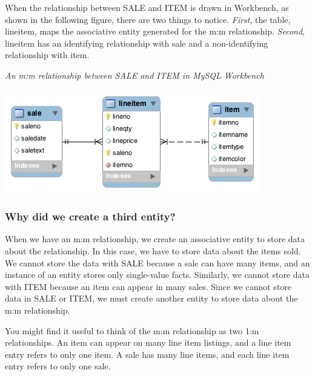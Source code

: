 \documentclass[
]{article}
\begin{document}
When the relationship between SALE and ITEM is drawn in Workbench, as shown in the following figure, there are two things to notice. \emph{First}, the table, lineitem, maps the associative entity generated for the m:m relationship. \emph{Second}, lineitem has an identifying relationship with sale and a non-identifying relationship with item.

\emph{An m:m relationship between SALE and ITEM in MySQL Workbench}

\includegraphics{Figures/Chapter 5/sale-item-wb.png}

\hypertarget{why-did-we-create-a-third-entity}{%
\subsubsection*{Why did we create a third entity?}\label{why-did-we-create-a-third-entity}}

When we have an m:m relationship, we create an associative entity to store data about the relationship. In this case, we have to store data about the items sold. We cannot store the data with SALE because a sale can have many items, and an instance of an entity stores only single-value facts. Similarly, we cannot store data with ITEM because an item can appear in many sales. Since we cannot store data in SALE or ITEM, we must create another entity to store data about the m:m relationship.

You might find it useful to think of the m:m relationship as two 1:m relationships. An item can appear on many line item listings, and a line item entry refers to only one item. A sale has many line items, and each line item entry refers to only one sale.
\end{document}
